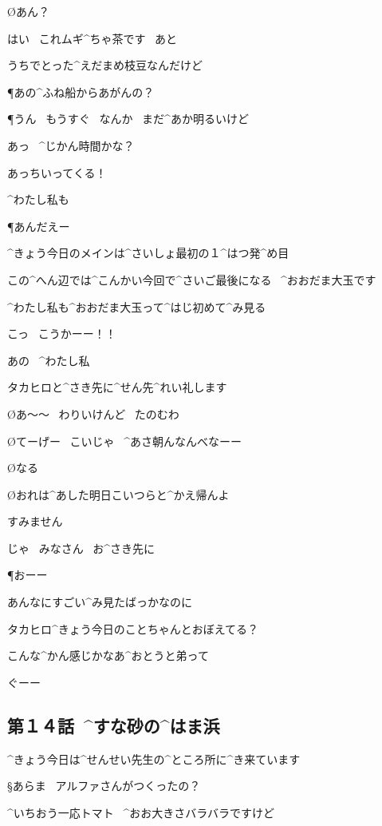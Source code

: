 \O あん？

\A はい
\ これムギ^{ちゃ}{茶}です
\ あと

\A うちでとった^{えだまめ}{枝豆}なんだけど

\P あの^{ふね}{船}からあがんの？

\P うん
\ もうすぐ
\ なんか
\ まだ^{あか}{明}るいけど

\page
\A あっ
\ ^{じかん}{時間}かな？

\T あっちいってくる！

\A ^{わたし}{私}も

\P あんだえー

\A ^{きょう}{今日}のメインは^{さいしょ}{最初}の１^{はつ}{発}^{め}{目}

\A この^{へん}{辺}では^{こんかい}{今回}で^{さいご}{最後}になる
\ ^{おおだま}{大玉}です

\page
\A ^{わたし}{私}も^{おおだま}{大玉}って^{はじ}{初}めて^{み}{見}る

\page[92]
\A こっ
\ こうかーー！！

\page[96]
\A あの
\ ^{わたし}{私}

\A タカヒロと^{さき}{先}に^{せん}{先}^{れい}{礼}します

\page
\O あ〜〜
\ わりいけんど
\ たのむわ

\O てーげー
\ こいじゃ
\ ^{あさ}{朝}んなんべなーー

\O なる

\O おれは^{あした}{明日}こいつらと^{かえ}{帰}んよ

\A すみません

\A じゃ
\ みなさん
\ お^{さき}{先}に

\P おーー

\page
\A あんなにすごい^{み}{見}たばっかなのに

\page
\A タカヒロ^{きょう}{今日}のことちゃんとおぼえてる？

\page
\A こんな^{かん}{感}じかなあ^{おとうと}{弟}って

\A ぐーー


\subsection{第１４話\ ^{すな}{砂}の^{はま}{浜}}

\page[102]
\A ^{きょう}{今日}は^{せんせい}{先生}の^{ところ}{所}に^{き}{来}ています

\S あらま
\ アルファさんがつくったの？

\A ^{いちおう}{一応}トマト
\ ^{おお}{大}きさバラバラですけど

